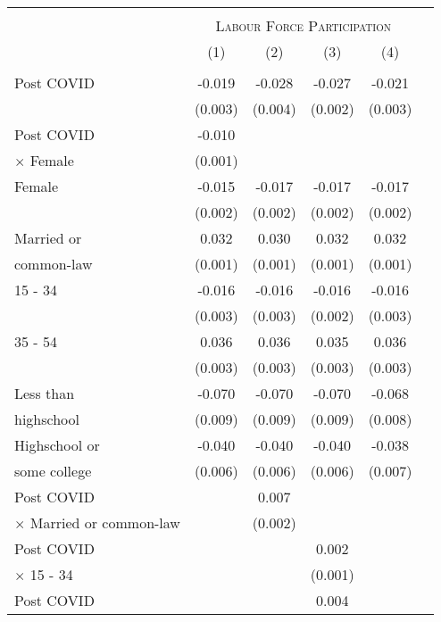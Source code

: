 \begin{tabular*}{\textwidth}{ @{\extracolsep{\fill}}l*{5}{c}}
\hline\hline
\\
& \multicolumn{4}{c}{ \textsc{Labour Force Participation} } \\
                &\multicolumn{1}{c}{(1)}&\multicolumn{1}{c}{(2)}&\multicolumn{1}{c}{(3)}&\multicolumn{1}{c}{(4)}\\
\hline
\\
Post COVID      &   -0.019&   -0.028&   -0.027&   -0.021\\
                &  (0.003)&  (0.004)&  (0.002)&  (0.003)\\
[0.5em]
Post COVID      &   -0.010&         &         &         \\
$\times$ Female &  (0.001)&         &         &         \\
[0.5em]
Female          &   -0.015&   -0.017&   -0.017&   -0.017\\
                &  (0.002)&  (0.002)&  (0.002)&  (0.002)\\
[0.5em]
Married or      &    0.032&    0.030&    0.032&    0.032\\
common-law      &  (0.001)&  (0.001)&  (0.001)&  (0.001)\\
[0.5em]
15 - 34         &   -0.016&   -0.016&   -0.016&   -0.016\\
                &  (0.003)&  (0.003)&  (0.002)&  (0.003)\\
[0.5em]
35 - 54         &    0.036&    0.036&    0.035&    0.036\\
                &  (0.003)&  (0.003)&  (0.003)&  (0.003)\\
[0.5em]
Less than       &   -0.070&   -0.070&   -0.070&   -0.068\\
highschool      &  (0.009)&  (0.009)&  (0.009)&  (0.008)\\
[0.5em]
Highschool or   &   -0.040&   -0.040&   -0.040&   -0.038\\
some college    &  (0.006)&  (0.006)&  (0.006)&  (0.007)\\
[0.5em]
Post COVID      &         &    0.007&         &         \\
$\times$ Married or common-law&         &  (0.002)&         &         \\
[0.5em]
Post COVID      &         &         &    0.002&         \\
$\times$ 15 - 34&         &         &  (0.001)&         \\
[0.5em]
Post COVID      &         &         &    0.004&         \\

\end{tabular*}
